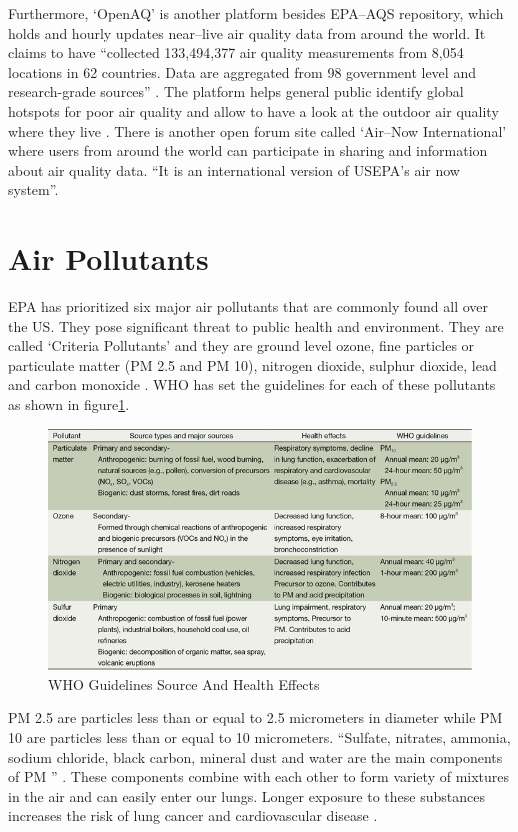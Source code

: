 \documentclass[sigconf]{acmart}
\begin{document}
{  Furthermore, `OpenAQ' is another platform besides EPA--AQS repository, which holds and hourly updates near--live air quality data from around the world. It claims to have ``collected 133,494,377 air quality measurements from 8,054 locations in 62 countries. Data are aggregated from 98 government level and research-grade sources'' \cite{googlecloud}. The platform helps general public identify global hotspots for poor air quality and allow to have a look at the outdoor air quality where they live \cite{googlecloud}. There is another open forum site called `Air--Now International' where users from around the world can participate in sharing and information about air quality data. ``It is an international version of USEPA's air now system''\cite{air-quality}.
  
  \section{Air Pollutants} EPA has prioritized six major air pollutants that are commonly found all over the US. They pose significant threat to public health and environment.  They are called `Criteria Pollutants' and they are ground level ozone, fine particles or particulate matter (PM 2.5 and PM 10), nitrogen dioxide, sulphur dioxide, lead and carbon monoxide \cite{epa-gov}. WHO has set the guidelines for each of these pollutants as shown in figure\ref{WHOGuidelines}.
  \begin{figure}[htb] \includegraphics[width=1.0\columnwidth]{images/SourceandHealthEffects.png} \caption{WHO Guidelines Source And Health Effects \cite{guidelines}} \label{WHOGuidelines} \end{figure} PM 2.5 are particles less than or equal to 2.5 micrometers in diameter while PM 10 are particles less than or equal to 10 micrometers. ``Sulfate, nitrates, ammonia, sodium chloride, black carbon, mineral dust and water are the main components of PM '' \cite{www-who}. These components combine with each other to form variety of mixtures in the air and can easily enter our lungs. Longer exposure to these substances increases the risk of lung cancer and cardiovascular disease \cite{www-who}.
}
\end{document}
